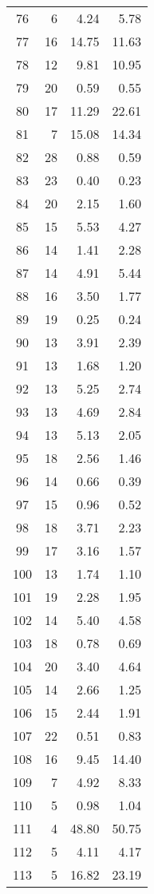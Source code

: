 \begin{longtable}{c r r r}
   76 & 6  & 4.24 & 5.78 \\ 
   77 & 16  & 14.75 & 11.63 \\ 
   78 & 12  & 9.81 & 10.95 \\ 
   79 & 20  & 0.59 & 0.55 \\ 
   80 & 17  & 11.29 & 22.61 \\ 
   81 & 7  & 15.08 & 14.34 \\ 
   82 & 28  & 0.88 & 0.59 \\ 
   83 & 23  & 0.40 & 0.23 \\ 
   84 & 20  & 2.15 & 1.60 \\ 
   85 & 15  & 5.53 & 4.27 \\ 
   86 & 14  & 1.41 & 2.28 \\ 
   87 & 14  & 4.91 & 5.44 \\ 
   88 & 16  & 3.50 & 1.77 \\ 
   89 & 19  & 0.25 & 0.24 \\ 
   90 & 13  & 3.91 & 2.39 \\ 
   91 & 13  & 1.68 & 1.20 \\ 
   92 & 13  & 5.25 & 2.74 \\ 
   93 & 13  & 4.69 & 2.84 \\ 
   94 & 13  & 5.13 & 2.05 \\ 
   95 & 18  & 2.56 & 1.46 \\ 
   96 & 14  & 0.66 & 0.39 \\ 
   97 & 15  & 0.96 & 0.52 \\ 
   98 & 18  & 3.71 & 2.23 \\ 
   99 & 17  & 3.16 & 1.57 \\ 
  100 & 13  & 1.74 & 1.10 \\ 
  101 & 19  & 2.28 & 1.95 \\ 
  102 & 14  & 5.40 & 4.58 \\ 
  103 & 18  & 0.78 & 0.69 \\ 
  104 & 20  & 3.40 & 4.64 \\ 
  105 & 14  & 2.66 & 1.25 \\ 
  106 & 15  & 2.44 & 1.91 \\ 
  107 & 22  & 0.51 & 0.83 \\ 
  108 & 16  & 9.45 & 14.40 \\ 
  109 & 7  & 4.92 & 8.33 \\ 
  110 & 5  & 0.98 & 1.04 \\ 
  111 & 4  & 48.80 & 50.75 \\ 
  112 & 5  & 4.11 & 4.17 \\ 
  113 & 5  & 16.82 & 23.19 \\ 

\end{longtable}
